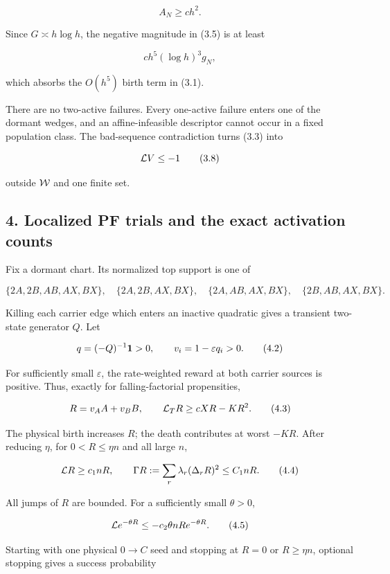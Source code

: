 \[
                              A_N\ge c h^2.             \tag{3.6}
\]

Since \(G\asymp h\log h\), the negative magnitude in (3.5) is at least

\[
                         ch^5(\log h)^3g_N,             \tag{3.7}
\]

which absorbs the \(O(h^5)\) birth term in (3.1).

There are no two-active failures. Every one-active failure enters one of
the dormant wedges, and an affine-infeasible descriptor cannot occur in
a fixed population class. The bad-sequence contradiction turns (3.3)
into

\[
                 {\cal L}V\le-1                         \tag{3.8}
\]

outside \({\cal W}\) and one finite set.

\subsection{4. Localized PF trials and the exact activation
counts}

Fix a dormant chart. Its normalized top support is one of

\[
\{2A,2B,AB,AX,BX\},\quad
\{2A,2B,AX,BX\},\quad
\{2A,AB,AX,BX\},\quad
\{2B,AB,AX,BX\}.                                      \tag{4.1}
\]

Killing each carrier edge which enters an inactive quadratic gives a
transient two-state generator \(Q\). Let

\[
 q=(-Q)^{-1}{\bf1}>0,\qquad v_i=1-\varepsilon q_i>0.   \tag{4.2}
\]

For sufficiently small \(\varepsilon\), the rate-weighted reward at both
carrier sources is positive. Thus, exactly for falling-factorial
propensities,

\[
 R=v_AA+v_BB,\qquad
 {\cal L}_TR\ge cXR-KR^2.                              \tag{4.3}
\]

The physical birth increases \(R\); the death contributes at worst
\(-KR\). After reducing \(\eta\), for \(0<R\le\eta n\) and all large
\(n\),

\[
 {\cal L}R\ge c_1nR,\qquad
 \Gamma R:=\sum_r\lambda_r(\Delta_rR)^2\le C_1nR.      \tag{4.4}
\]

All jumps of \(R\) are bounded. For a sufficiently small \(\theta>0\),

\[
 {\cal L}e^{-\theta R}
 \le-c_2\theta nR e^{-\theta R}.                       \tag{4.5}
\]

Starting with one physical \(0\to C\) seed and stopping at \(R=0\) or
\(R\ge\eta n\), optional stopping gives a success probability

